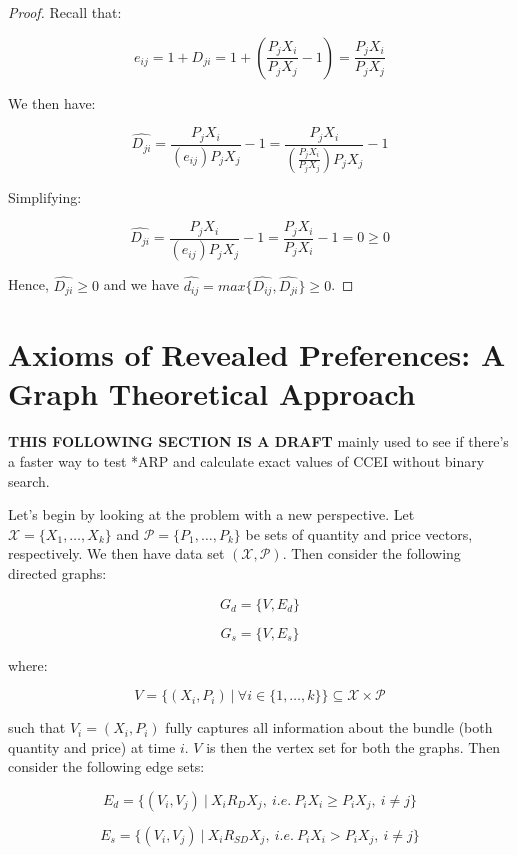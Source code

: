 \documentclass{article} %
\begin{document}
\begin{proof}
Recall that:

$$e_{ij}=1+D_{ji}=1+ \left (\frac{P_jX_i}{P_jX_j}-1 \right )=\frac{P_jX_i}{P_jX_j}$$

We then have:

$$\hat{D_{ji}}=\frac{P_jX_i}{(e_{ij})P_jX_j}-1=\frac{P_jX_i}{(\frac{P_jX_i}{P_jX_j})P_jX_j}-1$$

Simplifying:

$$\hat{D_{ji}}=\frac{P_jX_i}{(e_{ij})P_jX_j}-1=\frac{P_jX_i}{P_jX_i}-1=0\geq0$$

Hence, $\hat{D_{ji}}\geq0$ and we have $\hat{d_{ij}}=max\{\hat{D_{ij}},\hat{D_{ji}}\}\geq0$.

\end{proof}

\newpage

\section{Axioms of Revealed Preferences: A Graph Theoretical Approach}

\textbf{THIS FOLLOWING SECTION IS A DRAFT} mainly used to see if there's a faster way to test *ARP and calculate exact values of CCEI without binary search.


Let's begin by looking at the problem with a new perspective. Let $\mathcal{X}=\{X_1,\ldots,X_k\}$ and $\mathcal{P}=\{P_1,\ldots,P_k\}$ be sets of quantity and price vectors, respectively. We then have data set $(\mathcal{X},\mathcal{P})$. Then consider the following directed graphs:


\begin{minipage}{.5\linewidth}
$$G_d=\{V,E_d\}$$
\end{minipage}%
\begin{minipage}{.5\linewidth}
$$G_s=\{V,E_s\}$$
\end{minipage}


where:

$$V=\{(X_i,P_i)\ |\ \forall i\in\{1,\ldots,k\}\}\subseteq \mathcal{X}\times\mathcal{P}$$


such that $V_{i}=(X_i,P_i)$ fully captures all information about the bundle (both quantity and price) at time $i$. $V$ is then the vertex set for both the graphs. Then consider the following edge sets:

$$E_d=\{(V_i,V_j)\ |\ X_i R_D X_j,\ i.e.\ P_iX_i\geq P_iX_j,\ i\not=j\}$$

$$E_s=\{(V_i,V_j)\ |\ X_i R_{SD} X_j,\ i.e.\ P_iX_i> P_iX_j,\ i\not=j\}$$
\end{document}
